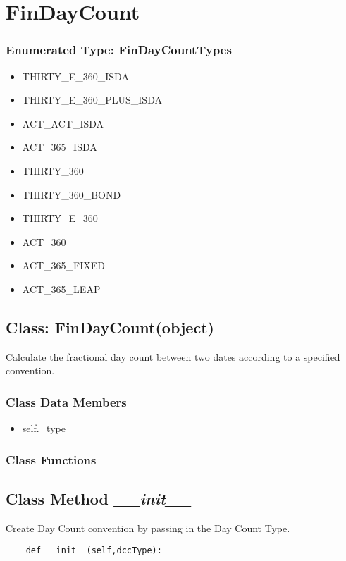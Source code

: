 \documentclass[twoside,11pt]{book}
\begin{document}
\newpage
\section{FinDayCount}

\subsubsection{Enumerated Type: FinDayCountTypes}
\begin{itemize}
\item{THIRTY\_E\_360\_ISDA}
\item{THIRTY\_E\_360\_PLUS\_ISDA}
\item{ACT\_ACT\_ISDA}
\item{ACT\_365\_ISDA}
\item{THIRTY\_360}
\item{THIRTY\_360\_BOND}
\item{THIRTY\_E\_360}
\item{ACT\_360}
\item{ACT\_365\_FIXED}
\item{ACT\_365\_LEAP}
\end{itemize}

\subsection{Class: FinDayCount(object)}
Calculate the fractional day count between two dates according to a specified convention. 

\subsubsection{Class Data Members}
\begin{itemize}
\item{self.\_type}
\end{itemize}

\subsubsection{Class Functions}

\subsection{Class Method {\it \_\_init\_\_}}
Create Day Count convention by passing in the Day Count Type. 

\begin{lstlisting}
    def __init__(self,dccType):
\end{lstlisting}
\end{document}
